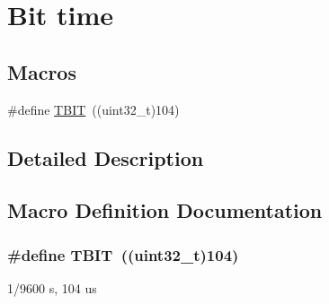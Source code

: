 \hypertarget{group___bittime}{}\section{Bit time}
\label{group___bittime}
\subsection*{Macros}
\begin{DoxyCompactItemize}
\item 
\#define \hyperlink{group___bittime_ga36667c1e76cecaf146a3de37425f1266}{T\+B\+IT}~((uint32\+\_\+t)104)
\end{DoxyCompactItemize}


\subsection{Detailed Description}


\subsection{Macro Definition Documentation}
\subsubsection[{\texorpdfstring{T\+B\+IT}{TBIT}}]{\setlength{\rightskip}{0pt plus 5cm}\#define T\+B\+IT~((uint32\+\_\+t)104)}\hypertarget{group___bittime_ga36667c1e76cecaf146a3de37425f1266}{}\label{group___bittime_ga36667c1e76cecaf146a3de37425f1266}
1/9600 s, 104 us 